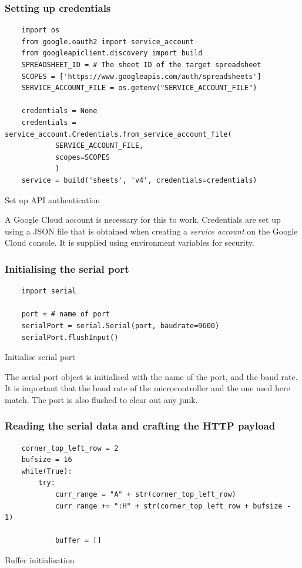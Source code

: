\documentclass[a4paper,12pt]{report}
\newenvironment{code}{\captionsetup{type=listing}}{}
\begin{document}
\subsubsection{Setting up credentials}
\begin{code}
    \begin{verbatim}
    import os
    from google.oauth2 import service_account
    from googleapiclient.discovery import build
    SPREADSHEET_ID = # The sheet ID of the target spreadsheet
    SCOPES = ['https://www.googleapis.com/auth/spreadsheets']
    SERVICE_ACCOUNT_FILE = os.getenv("SERVICE_ACCOUNT_FILE")

    credentials = None
    credentials = service_account.Credentials.from_service_account_file(
            SERVICE_ACCOUNT_FILE,
            scopes=SCOPES
            )
    service = build('sheets', 'v4', credentials=credentials)
    \end{verbatim}
    \caption{Set up API authentication}
    \label{code:apiauth}
\end{code}
\vspace{0.5cm}

A Google Cloud account is necessary for this to work.  Credentials are set up
using a JSON file that is obtained when creating a \textit{service account} on
the Google Cloud console. It is supplied using environment variables for
security.

\subsubsection{Initialising the serial port}
\begin{code}
    \begin{verbatim}
    import serial

    port = # name of port
    serialPort = serial.Serial(port, baudrate=9600)
    serialPort.flushInput()
    \end{verbatim}
    \caption{Initialise serial port}
    \label{code:initser}
\end{code}
\vspace{0.5cm}

The serial port object is initialised with the name of the port, and the baud
rate. It is important that the baud rate of the microcontroller and the one
used here match. The port is also flushed to clear out any junk.

\subsubsection{Reading the serial data and crafting the HTTP payload}
\begin{code}
    \begin{verbatim}
    corner_top_left_row = 2
    bufsize = 16
    while(True):
        try:
            curr_range = "A" + str(corner_top_left_row)
            curr_range += ":H" + str(corner_top_left_row + bufsize - 1)

            buffer = []
    \end{verbatim}
    \caption{Buffer initialisation}
    \label{code:initbuf}
\end{code}
\vspace{0.5cm}
\end{document}
